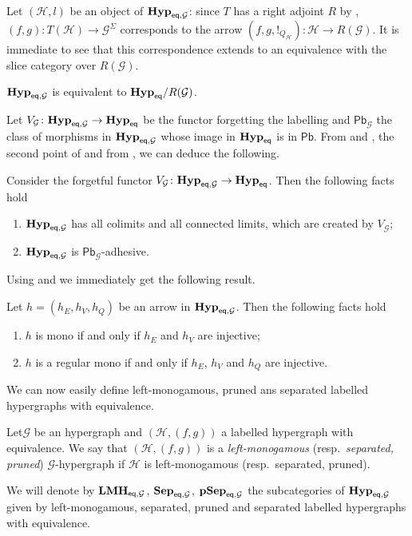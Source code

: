 \documentclass[3p]{elsarticle}
\newcommand{\pbc}{\mathsf{Pb}}
\newcommand{\eq}{\mathsf{eq}}
\newcommand{\catname}[1]{\textbf{\textup{#1}}}
\newcommand{\lmo}{\catname{LMH}}
\newcommand{\hyp}{\catname{Hyp}}
\newcommand{\pshyp}{\catname{pSep}}
\newcommand{\shyp}{\catname{Sep}}
\newcommand{\EqHyp}{\catname{Hyp}_{\mathsf{eq}}} %
\newcommand{\EqHyps}{\catname{Hyp}_{\mathsf{eq}, \mathcal{G}}}
\theoremstyle{remark}
\theoremstyle{definition}
\begin{document}
Let $(\mathcal{H}, l)$ be an object of $\EqHyps$: since $T$ has a right adjoint $R$ by , $(f,g)\colon T(\mathcal{H})\to \mathcal{G}^\Sigma$ corresponds to the arrow $(f, g, !_{Q_{\mathcal{H}}})\colon \mathcal{H}\to R(\mathcal{G})$. It is immediate to see that this correspondence extends to an equivalence with the slice category over $R(\mathcal{G})$.

\begin{prop}\label{prop:slice}
$\EqHyps$ is equivalent to $\EqHyp / R(\mathcal{G})$.
\end{prop}

Let $V_\mathcal{G}\colon \EqHyps\to \EqHyp$ be the functor forgetting the labelling and $\pbc_\mathcal{G}$ the class of morphisms in $\EqHyps$ whose image in $\EqHyp$ is in $\pbc$. From  and , the second point of  and from , we can deduce the following.

\begin{prop}\label{prop:lim}Consider the forgetful functor $V_\mathcal{G}\colon \EqHyps\to \EqHyp$. Then the following facts hold
	\begin{enumerate}
		\item $\EqHyps$ has all colimits and all connected limits, which are created by $V_\mathcal{G}$;
		\item $\EqHyps$ is $\pbc_\mathcal{G}$-adhesive.
	\end{enumerate}
\end{prop}

Using  and  we immediately get the following result. 

\begin{cor}\label{prop:monos_in_eqhyps} Let $h=(h_{E}, h_V, h_Q)$ be an arrow in $\EqHyps$. Then the following facts hold
	\begin{enumerate}
		\item $h$ is mono if and only if $h_E$ and $h_V$ are injective;
		\item $h$ is a regular mono if and only if $h_E$, $h_V$ and $h_Q$ are injective.
	\end{enumerate}
\end{cor}


We can now easily define left-monogamous, pruned ans separated labelled hypergraphs with equivalence.

\begin{defi}Let$\mathcal{G}$ be an hypergraph and $(\mathcal{H},(f,g))$ a labelled hypergraph with equivalence.  We say that $(\mathcal{H},(f,g))$ is a \emph{left-monogamous} (resp.~\emph{separated, pruned}) $\mathcal{G}$-hypergraph if $\mathcal{H}$ is left-monogamous (resp.~separated, pruned).
	
	We will denote by $\lmo_{\eq, \mathcal{G}}$, $\shyp_{\eq, \mathcal{G}}$, $\pshyp_{\eq, \mathcal{G}}$ the subcategories of $\hyp_{\eq, \mathcal{G}}$ given by left-monogamous, separated, pruned  and separated labelled hypergraphs with equivalence.
 \end{defi}
 
\end{document}
